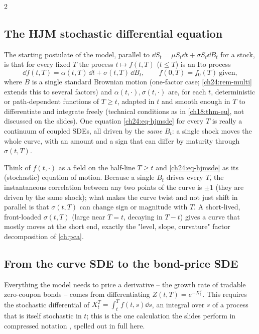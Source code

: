 \begin{paracol}{2}
\subsection{The HJM stochastic differential equation}
The starting postulate of the model, parallel to $\dd S_t=\mu S_t\dd t+\sigma S_t\dd B_t$ for a stock, is that for every fixed $T$ the process $t\mapsto f(t,T)$ ($t\le T$) is an Ito process
\begin{equation}\label{ch24:eq-hjmsde}
  \dd f(t,T)=\alpha(t,T)\,\dd t+\sigma(t,T)\,\dd B_t ,\qquad f(0,T)=f_0(T)\ \text{given},
\end{equation}
 where $B$ is a single standard Brownian motion (one-factor case; \cref{ch24:rem-multi} extends this to several factors) and $\alpha(t,\cdot),\sigma(t,\cdot)$ are, for each $t$, deterministic or path-dependent functions of $T\ge t$, adapted in $t$ and smooth enough in $T$ to differentiate and integrate freely (technical conditions as in \cref{ch18:thm-eu}, not discussed on the slides). One equation \eqref{ch24:eq-hjmsde} for every $T$ is really a continuum of coupled SDEs, all driven by the \emph{same} $B_t$: a single shock moves the whole curve, with an amount and a sign that can differ by maturity through $\sigma(t,T)$.
\begin{intuition}
Think of $f(t,\cdot)$ as a field on the half-line $T\ge t$ and \eqref{ch24:eq-hjmsde} as its (stochastic) equation of motion. Because a single $B_t$ drives every $T$, the instantaneous correlation between any two points of the curve is $\pm1$ (they are driven by the same shock); what makes the curve twist and not just shift in parallel is that $\sigma(t,T)$ can change sign or magnitude with $T$. A short-lived, front-loaded $\sigma(t,T)$ (large near $T=t$, decaying in $T-t$) gives a curve that mostly moves at the short end, exactly the "level, slope, curvature" factor decomposition of \cref{ch:pca}.
\end{intuition}

\subsection{From the curve SDE to the bond-price SDE}
Everything the model needs to price a derivative -- the growth rate of tradable zero-coupon bonds -- comes from differentiating $Z(t,T)=e^{-X_t^T}$. This requires the stochastic differential of $X_t^T=\int_t^Tf(t,s)\dd s$, an integral over $s$ of a process that is itself stochastic in $t$; this is the one calculation the slides perform in compressed notation , spelled out in full here.


\end{paracol}
